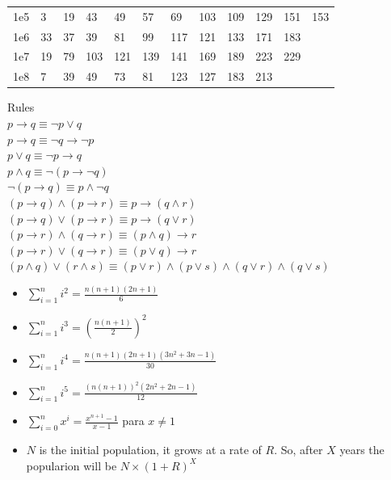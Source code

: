 \begin{tabular}{l l l l l l l l l l l l}
    1e5 & 3 & 19 & 43 & 49 & 57 & 69 & 103 & 109 & 129 & 151 & 153 \\
    1e6 & 33 & 37 & 39 & 81 & 99 & 117 & 121 & 133 & 171 & 183 \\
    1e7 & 19 & 79 & 103 & 121 & 139 & 141 & 169 & 189 & 223 & 229 \\
    1e8 & 7 & 39 & 49 & 73 & 81 & 123 & 127 & 183 & 213 \\
\end{tabular}
 Rules \\
$ p \rightarrow q \equiv \lnot p \lor q$ \\
$ p \rightarrow q \equiv \lnot q \rightarrow \lnot p$ \\
$ p \lor q \equiv \lnot p \rightarrow q$ 	\\
$ p \land q \equiv \lnot (p \rightarrow \lnot q)$	 \\
$ \lnot (p \rightarrow q) \equiv p \land \lnot q$ \\
$ (p \rightarrow q) \land (p \rightarrow r) \equiv p \rightarrow (q \land r)$ \\
$ (p \rightarrow q) \lor (p \rightarrow r) \equiv p \rightarrow (q \lor r)$ \\
$ (p \rightarrow r) \land (q \rightarrow r) \equiv (p \land q) \rightarrow r$ \\
$ (p \rightarrow r) \lor (q \rightarrow r) \equiv (p \lor q) \rightarrow r$ \\
$(p \land q) \lor (r \land s) \equiv (p \lor r) \land (p \lor s) \land (q \lor r) \land (q \lor s)$ \TopicBreak
{}
\begin{itemize}
\item	$\sum_{i=1}^{n} i^2 = \frac{n(n+1)(2n+1)}{6}$
\item	$\sum_{i=1}^{n} i^3 = (\frac{n(n+1)}{2})^2$
\item	$\sum_{i=1}^{n} i^4 = \frac{n(n+1)(2n+1)(3n^2+3n-1)}{30}$
\item	$\sum_{i=1}^{n} i^5 = \frac{(n(n+1))^2(2n^2+2n-1)}{12}$
\item	$\sum_{i=0}^{n} x^i = \frac{x^{n+1}-1}{x-1}$ para $x \neq 1$	
\end{itemize}
\begin{itemize}
\item $N$ is the initial population, it grows at a rate of $R$. So, after $X$ years the popularion will be $N \times (1 + R) ^ X$
\end{itemize}
